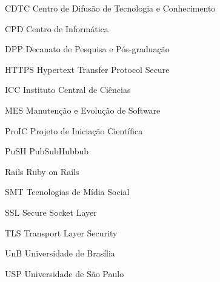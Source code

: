 \begin{siglas}
  \item[CDTC] Centro de Difusão de Tecnologia e Conhecimento
  \item[CPD] Centro de Informática
  \item[DPP] Decanato de Pesquisa e Pós-graduação
  \item[HTTPS] Hypertext Transfer Protocol Secure
  \item[ICC] Instituto Central de Ciências
  \item[MES] Manutenção e Evolução de Software
  \item[ProIC] Projeto de Iniciação Científica
  \item[PuSH] PubSubHubbub
  \item[Rails] Ruby on Rails
  \item[SMT] Tecnologias de Mídia Social
  \item[SSL] Secure Socket Layer
  \item[TLS] Transport Layer Security
  \item[UnB] Universidade de Brasília
  \item[USP] Universidade de São Paulo
\end{siglas}

